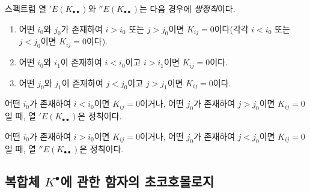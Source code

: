 \begin{env}[11.3.6]
\label{0.11.3.6-fr}
스펙트럼 열 $'E(K_{\bullet\bullet})$와
$''E(K_{\bullet\bullet})$는 다음 경우에 \emph{쌍정칙}이다.
\begin{enumerate}
  \item[(a)] 어떤 $i_0$와 $j_0$가 존재하여 $i>i_0$ 또는 $j>j_0$이면
    $K_{ij}=0$이다(각각 $i<i_0$
    또는 $j<j_0$이면 $K_{ij}=0$이다).
  \item[(b)] 어떤 $i_0$와 $i_1$이 존재하여 $i<i_0$이고 $i>i_1$이면
    $K_{ij}=0$이다.
  \item[(c)] 어떤 $j_0$와 $j_1$이 존재하여 $j<j_0$이고 $j>j_1$이면
    $K_{ij}=0$이다.
\end{enumerate}

어떤 $i_0$가 존재하여 $i<i_0$이면 $K_{ij}=0$이거나, 어떤 $j_0$가
존재하여 $j>j_0$이면 $K_{ij}=0$일 때, 열
$'E(K_{\bullet\bullet})$은 정칙이다.

어떤 $i_0$가 존재하여 $i>i_0$이면 $K_{ij}=0$이거나, 어떤 $j_0$가
존재하여 $j<j_0$이면 $K_{ij}=0$일 때, 열
$''E(K_{\bullet\bullet})$은 정칙이다.
\end{env}

\subsection{복합체 $K^\bullet$에 관한 함자의 초코호몰로지}
\label{subsection:0.11.4-fr}

